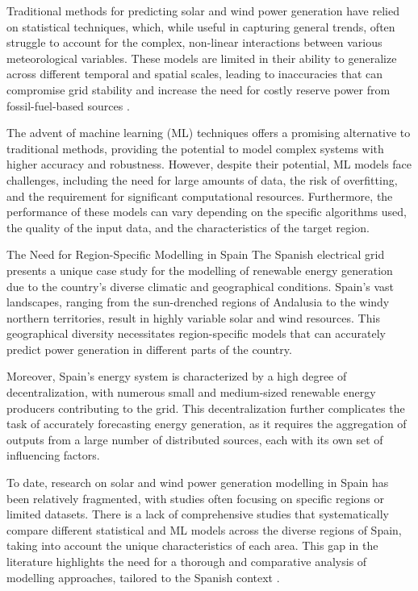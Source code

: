 Traditional methods for predicting solar and wind power generation have relied on statistical techniques, which, while useful in capturing general trends, often struggle to account for the complex, non-linear interactions between various meteorological variables. These models are limited in their ability to generalize across different temporal and spatial scales, leading to inaccuracies that can compromise grid stability and increase the need for costly reserve power from fossil-fuel-based sources .

The advent of machine learning (ML) techniques offers a promising alternative to traditional methods, providing the potential to model complex systems with higher accuracy and robustness. However, despite their potential, ML models face challenges, including the need for large amounts of data, the risk of overfitting, and the requirement for significant computational resources. Furthermore, the performance of these models can vary depending on the specific algorithms used, the quality of the input data, and the characteristics of the target region.

The Need for Region-Specific Modelling in Spain
The Spanish electrical grid presents a unique case study for the modelling of renewable energy generation due to the country’s diverse climatic and geographical conditions. Spain's vast landscapes, ranging from the sun-drenched regions of Andalusia to the windy northern territories, result in highly variable solar and wind resources. This geographical diversity necessitates region-specific models that can accurately predict power generation in different parts of the country.

Moreover, Spain's energy system is characterized by a high degree of decentralization, with numerous small and medium-sized renewable energy producers contributing to the grid. This decentralization further complicates the task of accurately forecasting energy generation, as it requires the aggregation of outputs from a large number of distributed sources, each with its own set of influencing factors.

To date, research on solar and wind power generation modelling in Spain has been relatively fragmented, with studies often focusing on specific regions or limited datasets. There is a lack of comprehensive studies that systematically compare different statistical and ML models across the diverse regions of Spain, taking into account the unique characteristics of each area. This gap in the literature highlights the need for a thorough and comparative analysis of modelling approaches, tailored to the Spanish context .

